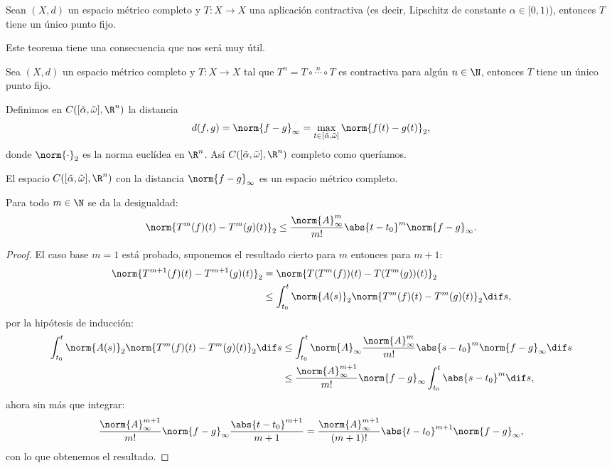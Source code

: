 \documentclass[../main.tex]{subfiles}
\begin{document}
\begin{theorem}
  Sean \((X, d)\) un espacio métrico completo y \(T : X \to X\) una aplicación
  contractiva (es decir, Lipschitz de constante \(\alpha \in [0, 1)\)), entonces
  \(T\) tiene un único punto fijo.
\end{theorem}

Este teorema tiene una consecuencia que nos será muy útil.

\begin{corollary}
	Sea \((X, d)\) un espacio métrico completo y \(T : X \to X\) tal que 
	\(T^n = T \circ \overset{n}{\cdots} \circ T\) es contractiva para algún
	\(n \in \N\), entonces \(T\) tiene un único punto fijo.
\end{corollary}

Definimos en \(C([\tilde{\alpha}, \tilde{\omega}], \R^n)\) la distancia 
\[d(f, g) = \norm{f - g}_{\infty} = 
	\max_{t \in [\tilde{\alpha}, \tilde{\omega}]} \norm{f(t) - g(t)}_2,\]
donde \(\norm{\cdot}_2\) es la norma euclídea en \(\R^n\). Así 
\(C([\tilde{\alpha}, \tilde{\omega}], \R^n)\) completo como queríamos.

\begin{lemma}
	El espacio \(C([\tilde{\alpha}, \tilde{\omega}], \R^n)\) con la distancia
	\(\norm{f - g}_\infty\) es un espacio métrico completo.
\end{lemma}

\begin{lemma}
\label{lem:desinfty}
	Para todo \(m \in \N\) se da la desigualdad:
	\[\norm{T^m(f)(t) - T^m(g)(t)}_2 \leq 
		\frac{\norm{A}^m_\infty}{m!} \abs{t - t_0}^m \norm{f - g}_\infty.\]
\end{lemma}

\begin{proof}
	El caso base \(m = 1\) está probado, suponemos el resultado cierto para 
	\(m\) entonces para \(m + 1\):
	\begin{align*}
		\norm{T^{m + 1}(f)(t) - T^{m + 1}(g)(t)}_2 
		&= \norm{T(T^m(f))(t) - T(T^m (g))(t)}_2 \\
		&\leq \int_{t_0}^t \norm{A(s)}_2 
			\norm{T^m(f)(t) - T^m (g)(t)}_2 \dif s,
	\end{align*}
	por la hipótesis de inducción:
	\begin{align*}
		\int_{t_0}^t \norm{A(s)}_2 
			\norm{T^m(f)(t) - T^m (g)(t)}_2 \dif s
		&\leq \int_{t_0}^t \norm{A}_\infty 
			\frac{\norm{A}^m_\infty}{m!} \abs{s - t_0}^m 
			\norm{f - g}_\infty \dif s \\
		&\leq \frac{\norm{A}^{m + 1}_\infty}{m!} \norm{f - g}_\infty 
			\int_{t_0}^t \abs{s - t_0}^m \dif s,
	\end{align*}
	ahora sin más que integrar:
	\[
		\frac{\norm{A}^{m + 1}_\infty}{m!} \norm{f - g}_\infty 
			\frac{\abs{t - t_0}^{m + 1}}{m + 1}
		= \frac{\norm{A}^{m + 1}_\infty}{(m + 1)!} \abs{t - t_0}^{m + 1} 
			\norm{f - g}_\infty,
	\]
	con lo que obtenemos el resultado.
\end{proof}
\end{document}
